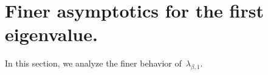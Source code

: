 \documentclass[10pt]{article}
\newcommand{\1}{\mathbbm 1}
\newtheorem{lemma}{Lemma}
\begin{document}

    \section{Finer asymptotics for the first eigenvalue.}
        In this section, we analyze the finer behavior of~$\lambda_{\beta,1}$. 
\end{document}
